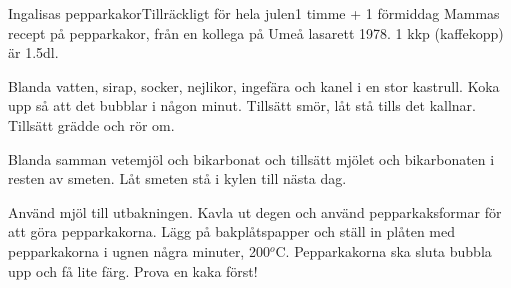 \documentclass[a4wide, 10pt]{article}
\begin{document}
\begin{recipe}{Ingalisas pepparkakor}{Tillräckligt för hela julen}{1 timme + 1 förmiddag}
\freeform Mammas recept på pepparkakor, från en kollega på Umeå lasarett 1978.
1 kkp (kaffekopp) är 1.5dl.


Blanda vatten, sirap, socker, nejlikor, ingefära och kanel i en stor
kastrull. Koka upp så att det bubblar i någon minut. Tillsätt
smör, låt stå tills det kallnar. Tillsätt grädde och rör
om.


Blanda samman vetemjöl och bikarbonat och tillsätt mjölet och
bikarbonaten i resten av smeten. Låt smeten stå i kylen till nästa
dag.
\end{recipe}

Använd mjöl till utbakningen. Kavla ut degen och använd
pepparkaksformar för att göra pepparkakorna. Lägg på bakplåtspapper
och ställ in plåten med pepparkakorna i ugnen några minuter,
200$^o$C. Pepparkakorna ska sluta bubbla upp och få lite färg. Prova
en kaka först!
\end{document}
